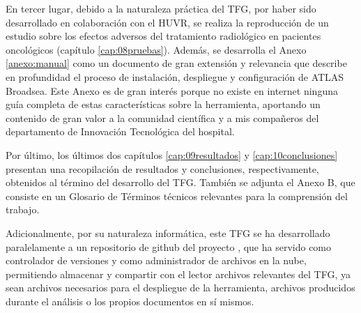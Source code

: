 En tercer lugar, debido a la naturaleza práctica del TFG, por haber sido desarrollado en colaboración con el HUVR, se realiza la reproducción de un estudio sobre los efectos adversos del tratamiento radiológico en pacientes oncológicos (capítulo \ref{cap:08pruebas}). Además, se desarrolla el Anexo \ref{anexo:manual} como un documento de gran extensión y relevancia que describe en profundidad el proceso de instalación, despliegue y configuración de ATLAS Broadsea. Este Anexo es de gran interés porque no existe en internet ninguna guía completa de estas características sobre la herramienta, aportando un contenido de gran valor a la comunidad científica y a mis compañeros del departamento de Innovación Tecnológica del hospital.

Por último, los últimos dos capítulos \ref{cap:09resultados} y \ref{cap:10conclusiones} presentan una recopilación de resultados y conclusiones, respectivamente, obtenidos al término del desarrollo del TFG. También se adjunta el Anexo B, que consiste en un Glosario de Términos técnicos relevantes para la comprensión del trabajo. 

Adicionalmente, por su naturaleza informática, este TFG se ha desarrollado paralelamente a un repositorio de github del proyecto \cite{vallealonsodc}, que ha servido como controlador de versiones y como administrador de archivos en la nube, permitiendo almacenar y compartir con el lector archivos relevantes del TFG, ya sean archivos necesarios para el despliegue de la herramienta, archivos producidos durante el análisis o los propios documentos en sí mismos.
